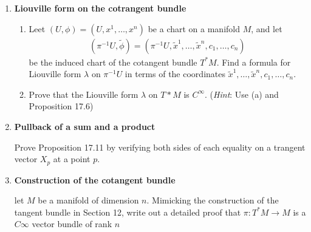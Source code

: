\documentclass[12pt,a4paper]{report}
\begin{document}
\begin{enumerate}[label=\textbf{17.\arabic*.}]
\item \textbf{Liouville form on the cotrangent bundle}

\begin{enumerate}[label=(\alph*)]

	\item Leet $(U, \phi)=(U, x^1,\dots, x^n)$ be a chart on a manifold $M$, and let 
	\begin{align*}
		(\pi^{-1}U, \tilde{\phi}) = (\pi^{-1}U, \tilde{x}^1,\dots,\tilde{x}^n, c_1,\dots,c_n)
	\end{align*}be the induced chart of the cotangent bundle $T^*M$.  Find a formula for Liouville form $\lambda$ on $\pi^{-1}U$ in terms of the coordinates $\tilde{x}^1,\dots,\tilde{x}^n,c_1,\dots,c_n$.
	
	\item Prove that the Liouville form $\lambda$ on $T*M$ is $C^\infty$. (\textit{Hint}: Use (a) and Proposition 17.6)

\end{enumerate}

\item \textbf{Pullback of a sum and a product}

Prove Proposition 17.11 by verifying both sides of each equality on a trangent vector $X_p$ at a point $p$.

\item \textbf{Construction of the cotangent bundle}

let $M$ be a manifold of dimension $n$.  Mimicking the construction of the tangent bundle in Section 12, write out a detailed proof that $\pi:T^*M\to M$ is a $C\infty$ vector bundle of rank $n$

\end{enumerate}
\end{document}
